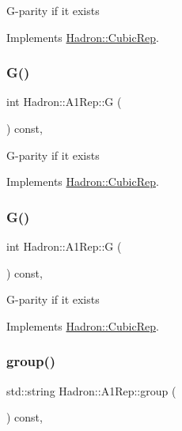 G-\/parity if it exists 

Implements \mbox{\hyperlink{structHadron_1_1CubicRep_a52104e43266d1614c00bbd1c3b395458}{Hadron\+::\+Cubic\+Rep}}.

\mbox{\label{structHadron_1_1A1Rep_a0d1f85837b8f29f9e51656b8bf2abfed}} 
\subsubsection{\texorpdfstring{G()}{G()}\hspace{0.1cm}{\footnotesize\ttfamily [2/3]}}
{\footnotesize\ttfamily int Hadron\+::\+A1\+Rep\+::G (\begin{DoxyParamCaption}{ }\end{DoxyParamCaption}) const\hspace{0.3cm}{\ttfamily [inline]}, {\ttfamily [virtual]}}

G-\/parity if it exists 

Implements \mbox{\hyperlink{structHadron_1_1CubicRep_a52104e43266d1614c00bbd1c3b395458}{Hadron\+::\+Cubic\+Rep}}.

\mbox{\label{structHadron_1_1A1Rep_a0d1f85837b8f29f9e51656b8bf2abfed}} 
\subsubsection{\texorpdfstring{G()}{G()}\hspace{0.1cm}{\footnotesize\ttfamily [3/3]}}
{\footnotesize\ttfamily int Hadron\+::\+A1\+Rep\+::G (\begin{DoxyParamCaption}{ }\end{DoxyParamCaption}) const\hspace{0.3cm}{\ttfamily [inline]}, {\ttfamily [virtual]}}

G-\/parity if it exists 

Implements \mbox{\hyperlink{structHadron_1_1CubicRep_a52104e43266d1614c00bbd1c3b395458}{Hadron\+::\+Cubic\+Rep}}.

\mbox{\label{structHadron_1_1A1Rep_a12c63341924c5a2e4c0444911503c3f8}} 
\subsubsection{\texorpdfstring{group()}{group()}\hspace{0.1cm}{\footnotesize\ttfamily [1/3]}}
{\footnotesize\ttfamily std\+::string Hadron\+::\+A1\+Rep\+::group (\begin{DoxyParamCaption}{ }\end{DoxyParamCaption}) const\hspace{0.3cm}{\ttfamily [inline]}, {\ttfamily [virtual]}}

